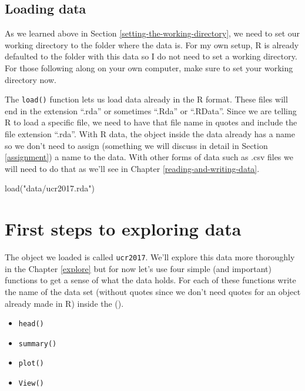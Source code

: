 \documentclass[
]{krantz}
\makeatletter
\newenvironment{Shaded}{\begin{snugshade}}{\end{snugshade}}
\newcommand{\FunctionTok}[1]{\textcolor[rgb]{0,0,0}{#1}}
\newcommand{\NormalTok}[1]{#1}
\newcommand{\StringTok}[1]{\textcolor[rgb]{0.5,0.5,0.5}{#1}}
\providecommand{\tightlist}{%
  \setlength{\itemsep}{0pt}\setlength{\parskip}{0pt}}
\newenvironment{kframe}{%
\medskip{}
\setlength{\fboxsep}{.8em}
 \def\at@end@of@kframe{}%
 \ifinner\ifhmode%
  \def\at@end@of@kframe{\end{minipage}}%
  \begin{minipage}{\columnwidth}%
 \fi\fi%
 \def\FrameCommand##1{\hskip\@totalleftmargin \hskip-\fboxsep
 \colorbox{shadecolor}{##1}\hskip-\fboxsep
     \hskip-\linewidth \hskip-\@totalleftmargin \hskip\columnwidth}%
 \MakeFramed {\advance\hsize-\width
   \@totalleftmargin\z@ \linewidth\hsize
   \@setminipage}}%
 {\par\unskip\endMakeFramed%
 \at@end@of@kframe}
\renewenvironment{Shaded}{\begin{kframe}}{\end{kframe}}
\makeatother
\begin{document}
\hypertarget{loading-data-intro}{%
\subsection{Loading data}\label{loading-data-intro}}

As we learned above in Section \ref{setting-the-working-directory}, we need to set our working directory to the folder where the data is. For my own setup, R is already defaulted to the folder with this data so I do not need to set a working directory. For those following along on your own computer, make sure to set your working directory now.

The \texttt{load()} function lets us load data already in the R format. These files will end in the extension ``.rda'' or sometimes ``.Rda'' or ``.RData''. Since we are telling R to load a specific file, we need to have that file name in quotes and include the file extension ``.rda''. With R data, the object inside the data already has a name so we don't need to assign (something we will discuss in detail in Section \ref{assignment}) a name to the data. With other forms of data such as .csv files we will need to do that as we'll see in Chapter \ref{reading-and-writing-data}.

\begin{Shaded}
\begin{Highlighting}[]
\FunctionTok{load}\NormalTok{(}\StringTok{"data/ucr2017.rda"}\NormalTok{)}
\end{Highlighting}
\end{Shaded}

\hypertarget{first-steps-to-exploring-data}{%
\section{First steps to exploring data}\label{first-steps-to-exploring-data}}

The object we loaded is called \texttt{ucr2017}. We'll explore this data more thoroughly in the Chapter \ref{explore} but for now let's use four simple (and important) functions to get a sense of what the data holds. For each of these functions write the name of the data set (without quotes since we don't need quotes for an object already made in R) inside the ().

\begin{itemize}
\tightlist
\item
  \texttt{head()}
\item
  \texttt{summary()}
\item
  \texttt{plot()}
\item
  \texttt{View()}
\end{itemize}
\end{document}
